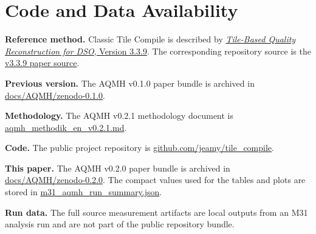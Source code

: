 \documentclass[10pt,twocolumn]{article}
\begin{document}
\newpage
\section*{Code and Data Availability}

\textbf{Reference method.}
Classic Tile Compile is described by
\href{https://doi.org/10.5281/zenodo.19437794}{\emph{Tile-Based Quality Reconstruction for DSO},
Version 3.3.9}. The corresponding repository source is the
\href{https://github.com/jeamy/tile_compile/blob/master/docs/v3/zenodo-3.3.9/paper-tile_based_quality_reconstruction_methodology_v_3.3.9_en.tex}{v3.3.9
paper source}.

\textbf{Previous version.}
The AQMH v0.1.0 paper bundle is archived in
\href{https://github.com/jeamy/tile_compile/tree/master/docs/AQMH/zenodo-0.1.0}{docs/AQMH/zenodo-0.1.0}.

\textbf{Methodology.}
The AQMH v0.2.1 methodology document is
\href{https://github.com/jeamy/tile_compile/blob/master/docs/AQMH/aqmh_methodik_en_v0.2.1.md}{aqmh\_methodik\_en\_v0.2.1.md}.

\textbf{Code.}
The public project repository is
\href{https://github.com/jeamy/tile_compile}{github.com/jeamy/tile\_compile}.

\textbf{This paper.}
The AQMH v0.2.0 paper bundle is archived in
\href{https://github.com/jeamy/tile_compile/tree/master/docs/AQMH/zenodo-0.2.0}{docs/AQMH/zenodo-0.2.0}.
The compact values used for the tables and plots are stored in
\href{https://github.com/jeamy/tile_compile/blob/master/docs/AQMH/zenodo-0.2.0/m31_aqmh_run_summary.json}{m31\_aqmh\_run\_summary.json}.

\textbf{Run data.}
The full source measurement artifacts are local outputs from an M31 analysis run and are not
part of the public repository bundle.
\end{document}
